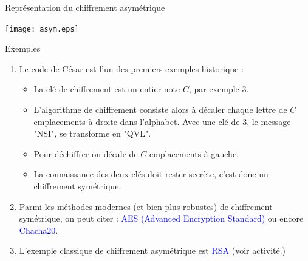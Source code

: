 \documentclass[10pt]{beamer}
\begin{document}
\begin{frame}
	\mframe{\SC}
	\begin{block}{Représentation du chiffrement asymétrique}
		\begin{center}
		\texttt{[image: asym.eps]}
		\end{center}
	\end{block}
\end{frame}


\begin{frame}
	\mframe{\SC}
	\begin{exampleblock}{Exemples}
		\begin{enumerate}
		\item<1-> Le code de César est l'un des premiers exemples historique :
		\begin{itemize}
			\item<2-> La clé de chiffrement est un entier note $C$, par exemple 3.
			\item<3-> L'algorithme de chiffrement consiste alors à décaler chaque lettre de $C$ emplacements à droite dans l'alphabet. Avec une clé de 3, le message "NSI", se transforme  en "QVL".
			\item<4-> Pour déchiffrer on décale de $C$ emplacements à gauche.
			\item<5-> La connaissance des deux clés doit rester secrète, c'est donc un chiffrement symétrique.
		\end{itemize}
		\item<6-> Parmi les méthodes modernes (et bien plus robustes) de chiffrement symétrique, on peut citer : \textcolor{blue}{AES (Advanced Encryption Standard)} ou encore \textcolor{blue}{Chacha20}.
		\item<7-> L'exemple classique de chiffrement asymétrique est \textcolor{blue}{RSA} (voir activité.)
	\end{enumerate}
	\end{exampleblock}
\end{frame}
\end{document}
